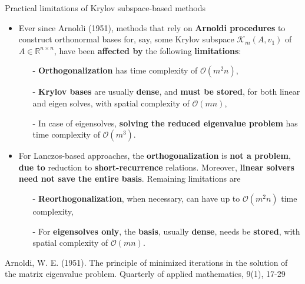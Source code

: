 \documentclass[t,usepdftitle=false]{beamer}
\begin{document}
\begin{frame}{Practical limitations of Krylov subspace-based methods}
\begin{itemize}
\item Ever since Arnoldi (1951), methods that rely on \textbf{Arnoldi procedures} to construct orthonormal bases for, say, some Krylov subspace $\mathcal{K}_m(A,v_1)$ of $A\in\mathbb{R}^{n\times n}$, have been \textbf{affected by} the following \textbf{limitations}:
\begin{itemize}\normalsize
\item[-] \textbf{Orthogonalization} has time complexity of $\mathcal{O}(m^2n)$,
\item[-] \textbf{Krylov bases} are usually \textbf{dense}, and \textbf{must be stored}, for both linear and eigen solves, with spatial complexity of $\mathcal{O}(mn)$,
\item[-] In case of eigensolves, \textbf{solving the reduced eigenvalue problem} has time complexity of $\mathcal{O}(m^3)$.
\end{itemize}
\item For Lanczos-based approaches, the \textbf{orthogonalization} is \textbf{not a problem}, \textbf{due to} reduction to \textbf{short-recurrence} relations.
Moreover, \textbf{linear solvers need not save the entire basis}.
Remaining limitations are
\begin{itemize}\normalsize
\item[-] \textbf{Reorthogonalization}, when necessary, can have up to $\mathcal{O}(m^2n)$ time complexity,
\item[-] For \textbf{eigensolves only}, the \textbf{basis}, usually \textbf{dense}, needs be \textbf{stored}, with spatial complexity of $\mathcal{O}(mn)$.
\end{itemize}
\end{itemize}\smallskip
\tiny{Arnoldi, W. E. (1951). The principle of minimized iterations in the solution of the matrix eigenvalue problem. Quarterly of applied mathematics, 9(1), 17-29}
\end{frame}
\end{document}
